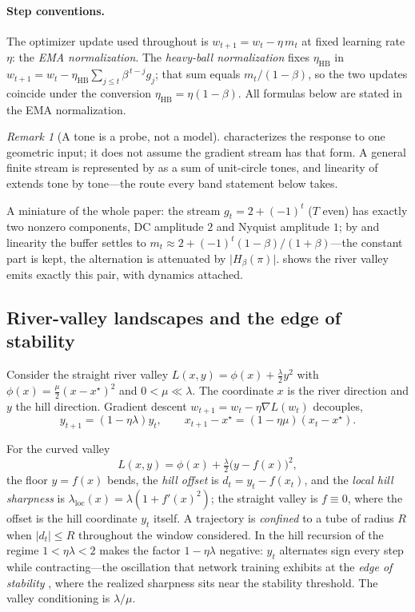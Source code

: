\documentclass[11pt,a4paper]{article}
\theoremstyle{remark}
\newtheorem{remark}{Remark}
\newcommand{\Hmag}[1]{\lvert H_\beta(#1)\rvert}
\begin{document}
\paragraph{Step conventions.} The optimizer update used throughout is $w_{t+1}=w_t-\eta\,m_t$ at fixed learning rate $\eta$: the \emph{EMA normalization}.
The \emph{heavy-ball normalization} fixes $\eta_{\mathrm{HB}}$ in $w_{t+1}=w_t-\eta_{\mathrm{HB}}\sum_{j\le t}\beta^{\,t-j}g_j$; that sum equals $m_t/(1-\beta)$, so the two updates coincide under the conversion $\eta_{\mathrm{HB}}=\eta(1-\beta)$.
All formulas below are stated in the EMA normalization.

\begin{remark}[A tone is a probe, not a model]
\label{rem:probe}
 characterizes the response to one geometric input; it does not assume the gradient stream has that form.
A general finite stream is represented by  as a sum of unit-circle tones, and linearity of  extends  tone by tone---the route every band statement below takes.
\end{remark}

A miniature of the whole paper: the stream $g_t=2+(-1)^{t}$ ($T$ even) has exactly two nonzero components, DC amplitude $2$ and Nyquist amplitude $1$; by  and linearity the buffer settles to $m_t\approx2+(-1)^{t}(1-\beta)/(1+\beta)$---the constant part is kept, the alternation is attenuated by $\Hmag{\pi}$.
 shows the river valley emits exactly this pair, with dynamics attached.

\subsection{River-valley landscapes and the edge of stability}
\label{sec:valley}

Consider the straight river valley $L(x,y)=\phi(x)+\tfrac{\lambda}{2}y^2$ with $\phi(x)=\tfrac{\mu}{2}(x-x^\star)^2$ and $0<\mu\ll\lambda$.
The coordinate $x$ is the river direction and $y$ the hill direction.
Gradient descent $w_{t+1}=w_t-\eta\nabla L(w_t)$ decouples,
\begin{equation}
\label{eq:rv-recur}
y_{t+1}=(1-\eta\lambda)y_t,\qquad x_{t+1}-x^\star=(1-\eta\mu)(x_t-x^\star).
\end{equation}

For the curved valley
\[
L(x,y)=\phi(x)+\tfrac{\lambda}{2}\bigl(y-f(x)\bigr)^2,
\]
the floor $y=f(x)$ bends, the \emph{hill offset} is $d_t=y_t-f(x_t)$, and the \emph{local hill sharpness} is $\lambda_{\mathrm{loc}}(x)=\lambda(1+f'(x)^2)$; the straight valley is $f\equiv0$, where the offset is the hill coordinate $y_t$ itself.
A trajectory is \emph{confined} to a tube of radius $R$ when $\lvert d_t\rvert\le R$ throughout the window considered.
In the hill recursion of  the regime $1<\eta\lambda<2$ makes the factor $1-\eta\lambda$ negative: $y_t$ alternates sign every step while contracting---the oscillation that network training exhibits at the \emph{edge of stability} \citep{cohen2021edge}, where the realized sharpness sits near the stability threshold.
The valley conditioning is $\lambda/\mu$.
\end{document}
